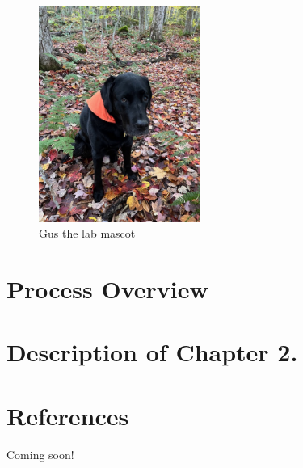 \documentclass[
  letterpaper,
  DIV=11,
  numbers=noendperiod]{scrreprt}
\newlength{\cslhangindent}
\newenvironment{CSLReferences}[2] %
 {\begin{list}{}{%
  \setlength{\itemindent}{0pt}
  \setlength{\leftmargin}{0pt}
  \setlength{\parsep}{0pt}
  \ifodd #1
   \setlength{\leftmargin}{\cslhangindent}
   \setlength{\itemindent}{-1\cslhangindent}
  \fi
  \setlength{\itemsep}{#2\baselineskip}}}
 {\end{list}}
\begin{document}
\begin{figure}[H]

{\centering \includegraphics[width=2.08333in,height=\textheight,keepaspectratio]{documentation/images/gus.jpg}

}

\caption{Gus the lab mascot}

\end{figure}%


\chapter{Process Overview}\label{process-overview}


\chapter{Description of Chapter 2.}\label{description-of-chapter-2.}


\chapter*{References}\label{references}


Coming soon!

\label{refs}
\begin{CSLReferences}{0}{1}
\end{CSLReferences}
\end{document}
